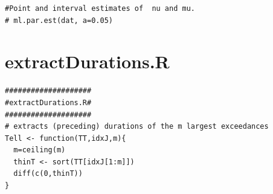 \documentclass[honours,12pt]{unswthesis}
\newcommand{\1}{\mathbf 1}
\numberwithin{equation}{section}
\theoremstyle{definition}
\theoremstyle{remark}
\begin{document}
\begin{appendices}
\begin{lstlisting}
#Point and interval estimates of  nu and mu. 
# ml.par.est(dat, a=0.05)
\end{lstlisting}
\section{extractDurations.R}
\begin{lstlisting}
####################
#extractDurations.R#
####################
# extracts (preceding) durations of the m largest exceedances
Tell <- function(TT,idxJ,m){
  m=ceiling(m)
  thinT <- sort(TT[idxJ[1:m]])
  diff(c(0,thinT))
}
\end{lstlisting}

\end{appendices}

\clearpage
{}


\end{document}
